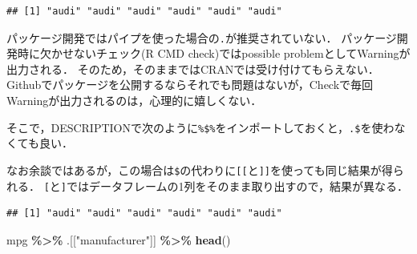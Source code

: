 \documentclass[
]{article}
\newenvironment{Shaded}{\begin{snugshade}}{\end{snugshade}}
\newcommand{\FunctionTok}[1]{\textcolor[rgb]{0.13,0.29,0.53}{\textbf{#1}}}
\newcommand{\NormalTok}[1]{#1}
\newcommand{\SpecialCharTok}[1]{\textcolor[rgb]{0.81,0.36,0.00}{\textbf{#1}}}
\newcommand{\StringTok}[1]{\textcolor[rgb]{0.31,0.60,0.02}{#1}}
\begin{document}
\begin{Shaded}
\end{Shaded}

\begin{verbatim}
## [1] "audi" "audi" "audi" "audi" "audi" "audi"
\end{verbatim}

パッケージ開発ではパイプを使った場合の\texttt{.}が推奨されていない．
パッケージ開発時に欠かせないチェック(R CMD check)ではpossible problemとしてWarningが出力される．
そのため，そのままではCRANでは受け付けてもらえない．
Githubでパッケージを公開するならそれでも問題はないが，Checkで毎回Warningが出力されるのは，心理的に嬉しくない．

そこで，DESCRIPTIONで次のように\texttt{\%\$\%}をインポートしておくと，\texttt{.\$}を使わなくても良い．

\begin{Shaded}
\end{Shaded}

なお余談ではあるが，この場合は\texttt{\$}の代わりに\texttt{{[}{[}}と\texttt{{]}{]}}を使っても同じ結果が得られる．
\texttt{{[}}と\texttt{{]}}ではデータフレームの1列をそのまま取り出すので，結果が異なる．

\begin{Shaded}
\end{Shaded}

\begin{verbatim}
## [1] "audi" "audi" "audi" "audi" "audi" "audi"
\end{verbatim}

\begin{Shaded}
\begin{Highlighting}[]
\NormalTok{mpg }\SpecialCharTok{\%\textgreater{}\%}\NormalTok{ .[[}\StringTok{"manufacturer"}\NormalTok{]] }\SpecialCharTok{\%\textgreater{}\%} \FunctionTok{head}\NormalTok{()}
\end{Highlighting}
\end{Shaded}
\end{document}
